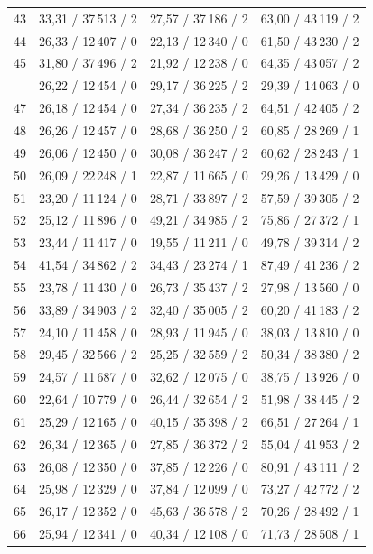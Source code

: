 \documentclass[a4paper,10pt]{article}
\begin{document}
\begin{longtable}{r r r r}
43 & 33,31 / 37\,513 / 2 & 27,57 / 37\,186 / 2 & 63,00 / 43\,119 / 2\\ 
44 & 26,33 / 12\,407 / 0 & 22,13 / 12\,340 / 0 & 61,50 / 43\,230 / 2\\ 
45 & 31,80 / 37\,496 / 2 & 21,92 / 12\,238 / 0 & 64,35 / 43\,057 / 2\\ 
\pagebreak[4]
46 & 26,22 / 12\,454 / 0 & 29,17 / 36\,225 / 2 & 29,39 / 14\,063 / 0\\ 
47 & 26,18 / 12\,454 / 0 & 27,34 / 36\,235 / 2 & 64,51 / 42\,405 / 2\\ 
48 & 26,26 / 12\,457 / 0 & 28,68 / 36\,250 / 2 & 60,85 / 28\,269 / 1\\ 
49 & 26,06 / 12\,450 / 0 & 30,08 / 36\,247 / 2 & 60,62 / 28\,243 / 1\\ 
50 & 26,09 / 22\,248 / 1 & 22,87 / 11\,665 / 0 & 29,26 / 13\,429 / 0\\ 
51 & 23,20 / 11\,124 / 0 & 28,71 / 33\,897 / 2 & 57,59 / 39\,305 / 2\\ 
52 & 25,12 / 11\,896 / 0 & 49,21 / 34\,985 / 2 & 75,86 / 27\,372 / 1\\ 
53 & 23,44 / 11\,417 / 0 & 19,55 / 11\,211 / 0 & 49,78 / 39\,314 / 2\\ 
54 & 41,54 / 34\,862 / 2 & 34,43 / 23\,274 / 1 & 87,49 / 41\,236 / 2\\ 
55 & 23,78 / 11\,430 / 0 & 26,73 / 35\,437 / 2 & 27,98 / 13\,560 / 0\\ 
56 & 33,89 / 34\,903 / 2 & 32,40 / 35\,005 / 2 & 60,20 / 41\,183 / 2\\ 
57 & 24,10 / 11\,458 / 0 & 28,93 / 11\,945 / 0 & 38,03 / 13\,810 / 0\\ 
58 & 29,45 / 32\,566 / 2 & 25,25 / 32\,559 / 2 & 50,34 / 38\,380 / 2\\ 
59 & 24,57 / 11\,687 / 0 & 32,62 / 12\,075 / 0 & 38,75 / 13\,926 / 0\\ 
60 & 22,64 / 10\,779 / 0 & 26,44 / 32\,654 / 2 & 51,98 / 38\,445 / 2\\ 
61 & 25,29 / 12\,165 / 0 & 40,15 / 35\,398 / 2 & 66,51 / 27\,264 / 1\\ 
62 & 26,34 / 12\,365 / 0 & 27,85 / 36\,372 / 2 & 55,04 / 41\,953 / 2\\ 
63 & 26,08 / 12\,350 / 0 & 37,85 / 12\,226 / 0 & 80,91 / 43\,111 / 2\\ 
64 & 25,98 / 12\,329 / 0 & 37,84 / 12\,099 / 0 & 73,27 / 42\,772 / 2\\ 
65 & 26,17 / 12\,352 / 0 & 45,63 / 36\,578 / 2 & 70,26 / 28\,492 / 1\\ 
66 & 25,94 / 12\,341 / 0 & 40,34 / 12\,108 / 0 & 71,73 / 28\,508 / 1\\ 

\end{longtable}
\end{document}
